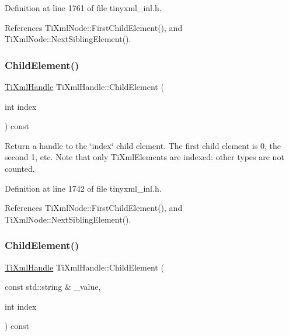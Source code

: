 Definition at line 1761 of file tinyxml\+\_\+inl.\+h.



References Ti\+Xml\+Node\+::\+First\+Child\+Element(), and Ti\+Xml\+Node\+::\+Next\+Sibling\+Element().

\hypertarget{class_ti_xml_handle_a57a639ab0ac99ff9358f675a1b73049a}{}\label{class_ti_xml_handle_a57a639ab0ac99ff9358f675a1b73049a} 
\subsubsection{\texorpdfstring{Child\+Element()}{ChildElement()}\hspace{0.1cm}{\footnotesize\ttfamily [2/3]}}
{\footnotesize\ttfamily \hyperlink{class_ti_xml_handle}{Ti\+Xml\+Handle} Ti\+Xml\+Handle\+::\+Child\+Element (\begin{DoxyParamCaption}\item[{int}]{index }\end{DoxyParamCaption}) const}

Return a handle to the \char`\"{}index\char`\"{} child element. The first child element is 0, the second 1, etc. Note that only Ti\+Xml\+Elements are indexed\+: other types are not counted. 

Definition at line 1742 of file tinyxml\+\_\+inl.\+h.



References Ti\+Xml\+Node\+::\+First\+Child\+Element(), and Ti\+Xml\+Node\+::\+Next\+Sibling\+Element().

\hypertarget{class_ti_xml_handle_afac0eed86787294829cca36c44626be2}{}\label{class_ti_xml_handle_afac0eed86787294829cca36c44626be2} 
\subsubsection{\texorpdfstring{Child\+Element()}{ChildElement()}\hspace{0.1cm}{\footnotesize\ttfamily [3/3]}}
{\footnotesize\ttfamily \hyperlink{class_ti_xml_handle}{Ti\+Xml\+Handle} Ti\+Xml\+Handle\+::\+Child\+Element (\begin{DoxyParamCaption}\item[{const std\+::string \&}]{\+\_\+value,  }\item[{int}]{index }\end{DoxyParamCaption}) const\hspace{0.3cm}{\ttfamily [inline]}}




